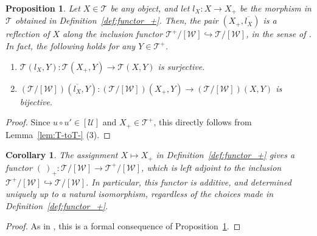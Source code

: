 \documentclass[a4paper,reqno,10pt]{amsart}
\newtheorem{proposition}[proposition]{Proposition}
\newtheorem{corollary}[corollary]{Corollary}
\theoremstyle{definition}
\theoremstyle{definition}
\theoremstyle{definition}
\theoremstyle{definition}
\theoremstyle{plain}
\newcommand{\CT}{\mathcal{T}}
\newcommand{\CU}{\mathcal{U}}
\newcommand{\CW}{\mathcal{W}}
\begin{document}
\begin{proposition}\label{prop:functor_+}
Let $X\in\CT$ be any object, and let $l_X\colon X\to X_+$ be the morphism in $\CT$ obtained in Definition~\ref{def:functor_+}. 
Then, the pair $(X_+,\overline{l_X})$ is a reflection of $X$ along the inclusion functor $\CT^+/[\CW]\hookrightarrow\CT/[\CW]$, in the sense of \cite[Definition~3.1.1]{Borc94}.
In fact, the following holds for any $Y\in\CT^+$.
\begin{enumerate}
\item $\CT(l_X,Y)\colon\CT(X_+,Y)\to\CT(X,Y)$ is surjective.
\item $(\CT/[\CW])(\overline{l_X},Y)\colon(\CT/[\CW])(X_+,Y)\to(\CT/[\CW])(X,Y)$ is bijective.
\end{enumerate}
\end{proposition}
\begin{proof}
Since $u\circ u'\in [\CU]$ and $X_+\in\CT^+$, this directly follows from Lemma~\ref{lem:T-toT-} {\rm (3)}.
\end{proof}

\begin{corollary}\label{cor:functor_+}
The assignment $X\mapsto X_+$ in Definition~\ref{def:functor_+} gives a functor 
$(\ )_+\colon\CT/[\CW]\to \CT^+/[\CW]$, which is left adjoint to the inclusion $\CT^+/[\CW]\hookrightarrow\CT/[\CW]$. In particular, this functor is additive, and determined uniquely up to a natural isomorphism, regardless of the choices made in Definition~\ref{def:functor_+}.
\end{corollary}
\begin{proof}
As in \cite[Proposition~3.1.3]{Borc94}, this is a formal consequence of Proposition~\ref{prop:functor_+}.
\end{proof}
\end{document}
